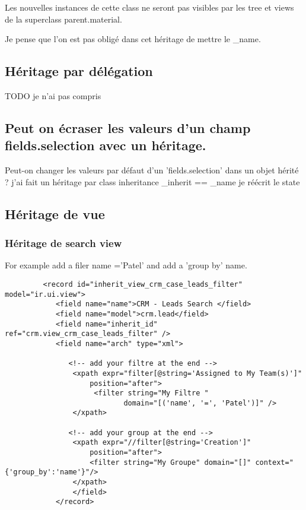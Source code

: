 \documentclass[12pt,a4paper]{article}
\begin{document}
Les nouvelles instances de cette class ne seront pas visibles par les tree et views de la superclass parent.material.

Je pense que l'on est pas obligé dans cet héritage de mettre le \_name.

\subsection{Héritage par délégation}
\label{sec:delegation}
TODO je n'ai pas compris


\subsection{Peut on écraser les valeurs d’un champ fields.selection avec un héritage.}
 
Peut-on changer les valeurs par défaut d’un ’fields.selection’ dans un objet hérité ?
j’ai fait un héritage par class inheritance \_inherit == \_name
je réécrit le state

\subsection{Héritage de vue}
\label{sec:inherit_view}

\subsubsection{Héritage de search view}
\label{sec:inherit_search_view}

For example add a filer name ='Patel' and add a 'group by' name.

\begin{verbatim}
         <record id="inherit_view_crm_case_leads_filter" model="ir.ui.view">
            <field name="name">CRM - Leads Search </field>
            <field name="model">crm.lead</field>
            <field name="inherit_id" ref="crm.view_crm_case_leads_filter" />
            <field name="arch" type="xml">

               <!-- add your filtre at the end -->
                <xpath expr="filter[@string='Assigned to My Team(s)']"
                    position="after">
                     <filter string="My Filtre "
                            domain="[('name', '=', 'Patel')]" />
                </xpath>

               <!-- add your group at the end -->
                <xpath expr="//filter[@string='Creation']"
                    position="after">
                    <filter string="My Groupe" domain="[]" context="{'group_by':'name'}"/>
                </xpath>                                    
                </field>
            </record>
\end{verbatim}
\end{document}
